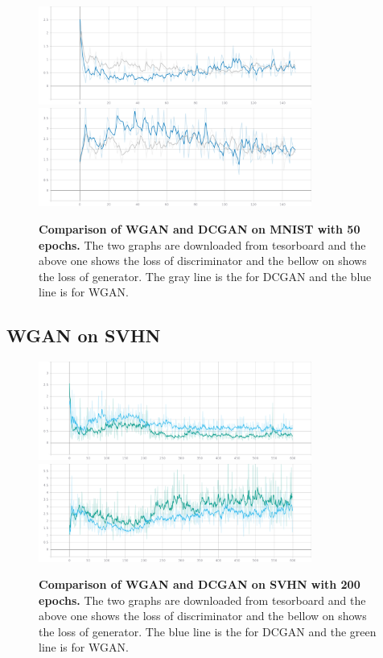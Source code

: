 \documentclass{article}
\newcommand{\mycaption}[2]{\caption[#1]{\textbf{#1.} #2}}
\begin{document}
\begin{figure}[!htb]
  \centering
  \includegraphics[width=0.8\textwidth]{imgs/mnist-train-discriminator-loss.png}
  \includegraphics[width=0.8\textwidth]{imgs/mnist-train-generator-loss.png}
  \mycaption{Comparison of WGAN and DCGAN on MNIST with 50 epochs}{The two graphs are downloaded from tesorboard and the above one shows the loss of discriminator and the bellow on shows the loss of generator. The gray line is the for DCGAN and the blue line is for WGAN.}  
  \label{fig_GANs_MNIST}
\end{figure}

\subsection{WGAN on SVHN}

\begin{figure}[!htb]
  \centering
  \includegraphics[width=0.8\textwidth]{imgs/svhn-train-discriminator-loss.png}
  \includegraphics[width=0.8\textwidth]{imgs/svhn-train-generator-loss.png}
  \mycaption{Comparison of WGAN and DCGAN on SVHN with 200 epochs}{The two graphs are downloaded from tesorboard and the above one shows the loss of discriminator and the bellow on shows the loss of generator. The blue line is the for DCGAN and the green line is for WGAN.}  
  \label{fig_GANs_SVHN}
\end{figure}
\end{document}
